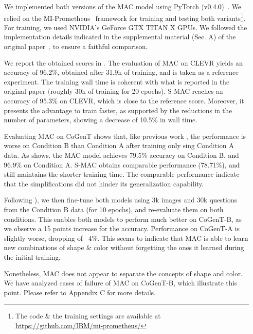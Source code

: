 We implemented both versions of the MAC model using PyTorch (v0.4.0)~\cite{paszke2017automatic}. We relied on the MI-Prometheus~\cite{kornuta2018accelerating} framework for training and testing both variants\footnote{The code \& the training settings are available at \url{https://github.com/IBM/mi-prometheus/}}. For training, we used NVIDIA's GeForce GTX TITAN X GPUs. We followed the implementation details indicated in the supplemental material (Sec. A) of the original paper~\cite{hudson2018compositional}, to ensure a faithful comparison.

We report the obtained scores in . The evaluation of MAC on CLEVR yields an accuracy of 96.2\%, obtained after 31.9h of training, and is taken as a reference experiment. The training wall time is coherent with what is reported in the original paper (roughly 30h of training for 20 epochs).
S-MAC reaches an accuracy of 95.3\% on CLEVR, which is close to the reference score. Moreover, it presents the advantage to train faster, as supported by the reductions in the number of parameters, showing a decrease of 10.5\% in wall time.

Evaluating MAC on CoGenT shows that, like previous work \cite{johnson2017inferring, mascharka2018transparency}, the performance is worse on Condition B than Condition A after training only sing Condition A data. As  shows, the MAC model achieves 79.5\% accuracy on Condition B, and 96.9\% on Condition A. S-MAC obtains comparable performance (78.71\%), and still maintains the shorter training time. The comparable performance indicate that the simplifications did not hinder its generalization capability.

Following \cite{johnson2017inferring, perez2017film}), we then fine-tune both models using 3k images and 30k questions from the Condition B data (for 10 epochs), and re-evaluate them on both conditions. This enables both models to perform much better on CoGenT-B, as we observe a 15 points increase for the accuracy. Performance on CoGenT-A is slightly worse, dropping of ~4\%. This seems to indicate that MAC is able to learn new combinations of shape \& color without forgetting the ones it learned during the initial training.

Nonetheless, MAC does not appear to separate the concepts of shape and color. We have analyzed cases of failure of MAC on CoGenT-B, which illustrate this point. Please refer to Appendix C for more details.
